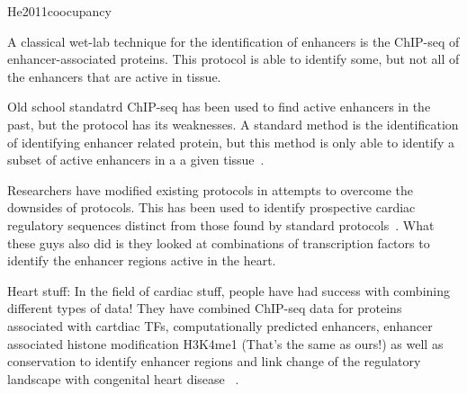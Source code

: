 He2011coocupancy

A classical wet-lab technique for the identification of enhancers is the ChIP-seq of enhancer-associated proteins. 
This protocol is able to identify some, but not all of the enhancers that are active in tissue.

Old school standatrd ChIP-seq has been used to find active enhancers in the past, but the protocol has its weaknesses. A standard method is the identification of identifying enhancer related protein, but this method is only able to identify a subset of active enhancers in a a given tissue~\cite{heintzman2007distinct}.  

Researchers have modified existing protocols in attempts to overcome the downsides of protocols. This has been used to identify prospective cardiac regulatory sequences distinct from those found by standard protocols~\cite{he2011co}. What these guys also did is they looked at combinations of transcription factors to identify the enhancer regions active in the heart.

Heart stuff: In the field of cardiac stuff, people have had success with combining different types of data! They have combined ChIP-seq data for proteins associated with cartdiac TFs, computationally predicted enhancers, enhancer associated histone modification H3K4me1 (That's the same as ours!) as well as conservation to identify enhancer regions and link change of the regulatory landscape with congenital heart disease ~\cite{smemo2012regulatory}.  

